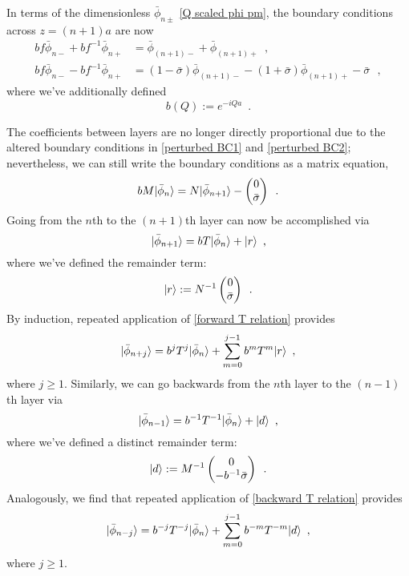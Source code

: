 \documentclass{article}
\begin{document}
In terms of the dimensionless $\bar\phi_{n\pm}$ \eqref{Q scaled phi pm}, the boundary conditions across $z=(n+1)a$ are now
\begin{align}
    \label{perturbed BC1}
    bf \bar\phi_{n-} + bf^{-1}\bar\phi_{n+} &= \bar\phi_{(n+1)-} + \bar\phi_{(n+1)+}
    \,\,\,,
    \\
    \label{perturbed BC2}
    bf \bar\phi_{n-} - bf^{-1}\bar\phi_{n+} &= (1-\bar\sigma)\bar\phi_{(n+1)-}-(1+\bar\sigma)\bar\phi_{(n+1)+} - \bar\sigma
    \,\,\,\,,
\end{align}
where we've additionally defined
\begin{equation}
    \label{b def}
    b(Q):=e^{-i Q a}
    \,\,\,.
\end{equation}

The coefficients between layers are no longer directly proportional due to the altered boundary conditions in \eqref{perturbed BC1} and \eqref{perturbed BC2}; nevertheless, we can still write the boundary conditions as a matrix equation,
\begin{equation}
    \label{perturbed matrix BC}
    bM\lvert\bar\phi_n\rangle = N\lvert\bar \phi_{n+1}\rangle
    -
    \begin{pmatrix}
    0
    \\
    \bar\sigma
    \end{pmatrix}
    \,\,\,.
\end{equation}
Going from the $n$th to the $(n+1)$th layer can now be accomplished via
\begin{equation}
    \label{forward T relation}
    \lvert\bar\phi_{n+1}\rangle
    =
    bT\lvert\bar\phi_n\rangle+\lvert r\rangle
    \,\,\,,
\end{equation}
where we've defined the remainder term:
\begin{equation}
    \label{r def}
    \lvert r\rangle := N^{-1}\begin{pmatrix}
    0
    \\
    \bar\sigma
    \end{pmatrix}
    \,\,\,.
\end{equation}
By induction, repeated application of \eqref{forward T relation} provides
\begin{equation}
    \label{forward j T relation}
    \lvert\bar\phi_{n+j}\rangle = b^j T^j\lvert\bar\phi_{n}\rangle + \sum_{m=0}^{j-1} b^m T^m\lvert r\rangle
    \,\,\,,
\end{equation}
where $j\ge1$.  Similarly, we can go backwards from the $n$th layer to the $(n-1)$th layer via
\begin{equation}
    \label{backward T relation}
    \lvert\bar\phi_{n-1}\rangle = b^{-1}T^{-1}\lvert\bar\phi_{n}\rangle + \lvert d\rangle
    \,\,\,,
\end{equation}
where we've defined a distinct remainder term:
\begin{equation}
    \label{d def}
    \lvert d\rangle:=M^{-1}
    \begin{pmatrix}
    0
    \\
    -b^{-1}\bar\sigma
    \end{pmatrix}
    \,\,\,.
\end{equation}
Analogously, we find that repeated application of \eqref{backward T relation} provides
\begin{equation}
    \label{backward j T relation}
    \lvert\bar\phi_{n-j}\rangle
    =
    b^{-j} T^{-j}\lvert\bar\phi_n\rangle +\sum_{m=0}^{j-1}b^{-m}T^{-m}\lvert d\rangle
    \,\,\,,
\end{equation}
where $j\ge1$.
\end{document}
